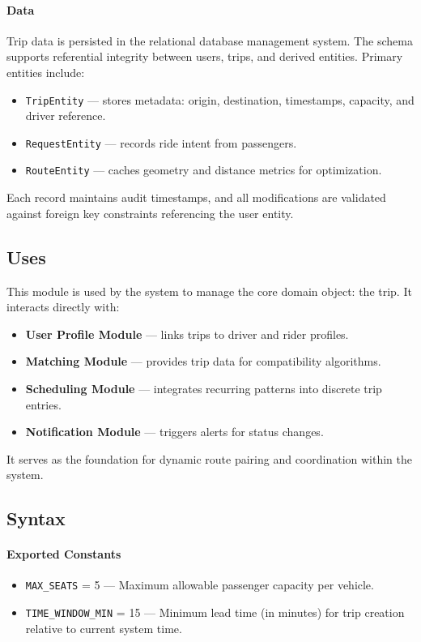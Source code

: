 \paragraph{Data}
Trip data is persisted in the relational database management system. 
The schema supports referential integrity between users, trips, and derived entities. 
Primary entities include:
\begin{itemize}
    \item \texttt{TripEntity} --- stores metadata: origin, destination, timestamps, capacity, and driver reference.
    \item \texttt{RequestEntity} --- records ride intent from passengers.
    \item \texttt{RouteEntity} --- caches geometry and distance metrics for optimization.
\end{itemize}
Each record maintains audit timestamps, and all modifications are validated against foreign key constraints referencing the user entity.

\subsection{Uses}
This module is used by the system to manage the core domain object: the trip. 
It interacts directly with:
\begin{itemize}
    \item \textbf{User Profile Module} --- links trips to driver and rider profiles.
    \item \textbf{Matching Module} --- provides trip data for compatibility algorithms.
    \item \textbf{Scheduling Module} --- integrates recurring patterns into discrete trip entries.
    \item \textbf{Notification Module} --- triggers alerts for status changes.
\end{itemize}
It serves as the foundation for dynamic route pairing and coordination within the system.

\subsection{Syntax}

\paragraph{Exported Constants}
\begin{itemize}
    \item \texttt{MAX\_SEATS} = 5 --- Maximum allowable passenger capacity per vehicle.
    \item \texttt{TIME\_WINDOW\_MIN} = 15 --- Minimum lead time (in minutes) for trip creation relative to current system time.
\end{itemize}

